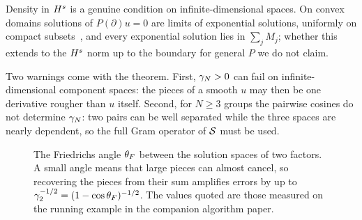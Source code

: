 Density in $H^{s}$ is a genuine condition on infinite-dimensional spaces. On convex domains solutions of
$P(\partial)u=0$ are limits of exponential solutions, uniformly on compact subsets~\cite{Mal56,Hor90},
and every exponential solution lies in $\sum_jM_j$; whether this extends to the $H^{s}$ norm up to the boundary
for general $P$ we do not claim.

Two warnings come with the theorem. First, $\gamma_{N}>0$ can fail on infinite-dimensional component spaces: the pieces of a smooth $u$ may then be
one derivative rougher than $u$ itself. Second, for $N\ge3$ groups the pairwise cosines do not
determine $\gamma_{N}$: two pairs can be well separated while the three spaces are nearly dependent, so the
full Gram operator of $\mathcal{S}$ must be used.

\begin{figure}[tbp]
\centering
{}
\caption{The Friedrichs angle $\theta_{F}$ between the solution spaces of two factors. A small angle
means that large pieces can almost cancel, so recovering the pieces from their sum amplifies errors by
up to $\gamma_2^{-1/2}=(1-\cos\theta_{F})^{-1/2}$. The values quoted are those measured on the running
example in the companion algorithm paper.}\label{fig:friedrichs}
\end{figure}

